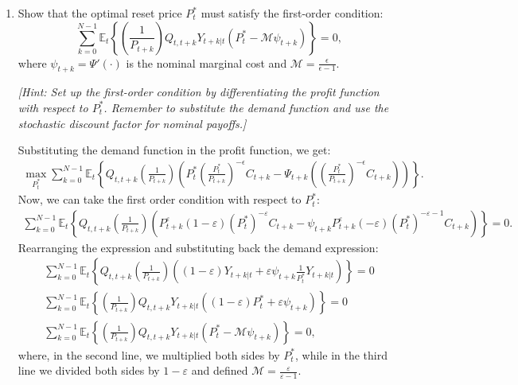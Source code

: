 \documentclass[dvipsnames,11pt]{article}
\begin{document}
    \begin{enumerate}
        \item Show that the optimal reset price \( P_t^* \) must satisfy the first-order condition:
        \[
        \sum_{k=0}^{N-1} \mathbb{E}_t \left\{ \left( \frac{1}{P_{t+k}} \right) Q_{t,t+k} Y_{t+k|t} \left( P_t^* - \mathcal{M} \psi_{t+k} \right) \right\} = 0,
        \]
        where \( \psi_{t+k} = \Psi'(\cdot) \) is the nominal marginal cost and \( \mathcal{M} = \frac{\epsilon}{\epsilon - 1} \).
    
        \textit{[Hint: Set up the first-order condition by differentiating the profit function with respect to \( P_t^* \). Remember to substitute the demand function and use the stochastic discount factor for nominal payoffs.]}
    
            \begin{solution}
Substituting the demand function in the profit function, we get:
\begin{align*}
    \max_{P_t^*} \sum_{k=0}^{N-1} \mathbb{E}_t \left\{ Q_{t,t+k} \left( \frac{1}{P_{t+k}} \right) \left( P_t^* \left( \frac{P_t^*}{P_{t+k}} \right)^{-\epsilon} C_{t+k} - \Psi_{t+k}\left(\left( \frac{P_t^*}{P_{t+k}} \right)^{-\epsilon} C_{t+k}\right) \right) \right\}.
\end{align*}
Now, we can take the first order condition with respect to $P_t^*$:
\begin{align*}
    \sum_{k=0}^{N-1} \mathbb{E}_t \left \{ Q_{t,t+k} \left( \frac{1}{P_{t+k}} \right) \left( P_{t+k}^\varepsilon (1-\varepsilon) (P_t^*)^{-\varepsilon}C_{t+k}- \psi_{t+k} P_{t+k}^\varepsilon (-\varepsilon) (P_t^*)^{-\varepsilon-1} C_{t+k} \right)\right \}=0.
\end{align*}
Rearranging the expression and substituting back the demand expression:
\begin{align*}
     \sum_{k=0}^{N-1} \mathbb{E}_t \left \{ Q_{t,t+k} \left( \frac{1}{P_{t+k}} \right) \left((1-\varepsilon)Y_{t+k|t} + \varepsilon \psi_{t+k} \frac{1}{P_t^*} Y_{t+k|t} \right)\right \}=0  \\
     \sum_{k=0}^{N-1} \mathbb{E}_t \left \{  \left( \frac{1}{P_{t+k}} \right) Q_{t,t+k} Y_{t+k|t}\left((1-\varepsilon)P_t^* + \varepsilon \psi_{t+k} \right)\right \}=0 \\
     \sum_{k=0}^{N-1} \mathbb{E}_t \left\{ \left( \frac{1}{P_{t+k}} \right) Q_{t,t+k} Y_{t+k|t} \left( P_t^* - \mathcal{M} \psi_{t+k} \right) \right\} = 0,
\end{align*}
where, in the second line, we multiplied both sides by $P_t^*$, while in the third line we divided both sides by $1-\varepsilon$ and defined $\mathcal{M}=\frac{\varepsilon}{\varepsilon-1}$.
                

\end{solution}
\end{enumerate}
\end{document}
